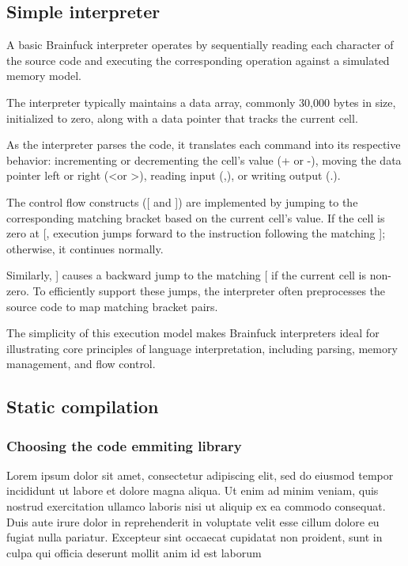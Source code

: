 \subsection{Simple interpreter}
\label{sec:ch2sec2sub1}

\par A basic Brainfuck interpreter operates by sequentially reading each character of the source code and executing the corresponding operation against a simulated memory model.

\par The interpreter typically maintains a data array, commonly 30,000 bytes in size, initialized to zero, along with a data pointer that tracks the current cell.

\par As the interpreter parses the code, it translates each command into its respective behavior: incrementing or decrementing the cell's value (+ or -), moving the data pointer left or right (\textless or \textgreater), reading input (,), or writing output (.).

\par The control flow constructs ([ and ]) are implemented by jumping to the corresponding matching bracket based on the current cell's value. If the cell is zero at [, execution jumps forward to the instruction following the matching ]; otherwise, it continues normally.

\par Similarly, ] causes a backward jump to the matching [ if the current cell is non-zero. To efficiently support these jumps, the interpreter often preprocesses the source code to map matching bracket pairs.

\par The simplicity of this execution model makes Brainfuck interpreters ideal for illustrating core principles of language interpretation, including parsing, memory management, and flow control.

\subsection{Static compilation}
\label{sec:ch2sec2sub2}

\subsubsection{Choosing the code emmiting library}
\label{sec:ch2sec2sub2sec1}

\par Lorem ipsum dolor sit amet, consectetur adipiscing elit, sed do eiusmod tempor incididunt ut labore et dolore magna aliqua. Ut enim ad minim veniam, quis nostrud exercitation ullamco laboris nisi ut aliquip ex ea commodo consequat. Duis aute irure dolor in reprehenderit in voluptate velit esse cillum dolore eu fugiat nulla pariatur. Excepteur sint occaecat cupidatat non proident, sunt in culpa qui officia deserunt mollit anim id est laborum

